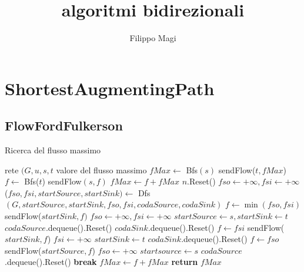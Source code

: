 \documentclass{article}
\title{algoritmi bidirezionali}
\author{Filippo Magi }
\begin{document}
\maketitle
\section{ShortestAugmentingPath}
\subsection{FlowFordFulkerson}
\begin{algorithm}
    \caption{Ricerca del flusso massimo}
    \begin{algorithmic}[1]
        \REQUIRE rete $(G,u,s,t$
        \ENSURE valore del flusso massimo
        \STATE $fMax \leftarrow$ Bfs$(s)$
        \STATE sendFlow($t,fMax$) 
        \STATE $f \leftarrow$ Bfs($t$) 
        \STATE sendFlow$(s,f)$
        \STATE $fMax \leftarrow f + fMax$
        \STATE $n.$Reset() 
        \ENDFOR
        \STATE $fso \leftarrow +\infty, fsi \leftarrow +\infty$
        \STATE ($fso,fsi,startSource,startSink) \leftarrow$ Dfs $(G,startSource,startSink,fso,fsi,codaSource,codaSink)$
            \STATE $f \leftarrow \min(fso,fsi)$
            \STATE sendFlow($startSink,f)$
            \STATE $fso \leftarrow +\infty, fsi \leftarrow +\infty$
            \STATE $startSource \leftarrow s, startSink \leftarrow t$
            \STATE $codaSource$.dequeue().Reset()
            \ENDWHILE
            \STATE$codaSink$.dequeue().Reset()
            \ENDWHILE
            \STATE $f \leftarrow fsi$
            \STATE sendFlow($startSink,f$)
            \STATE $fsi \leftarrow +\infty$
            \STATE $startSink \leftarrow t$
            \STATE$codaSink$.dequeue().Reset()
            \ENDWHILE
            \STATE $f \leftarrow fso$
            \STATE sendFlow($startSource,f$)
            \STATE $fso \leftarrow +\infty$
            \STATE $startsource \leftarrow s$
            \STATE $codaSource$.dequeue().Reset()
            \ENDWHILE
            \ELSE
            \STATE \textbf{break}
            \ENDIF
            \STATE $fMax \leftarrow f + fMax$
            \ENDWHILE
            \STATE \textbf{return} $fMax$
    \end{algorithmic}
\end{algorithm}
\end{document}
